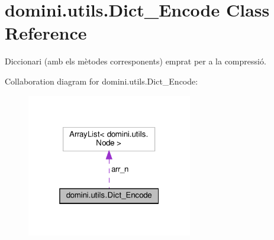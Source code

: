 \hypertarget{classdomini_1_1utils_1_1Dict__Encode}{}\section{domini.\+utils.\+Dict\+\_\+\+Encode Class Reference}
\label{classdomini_1_1utils_1_1Dict__Encode}


Diccionari (amb els mètodes corresponents) emprat per a la compressió.  




Collaboration diagram for domini.\+utils.\+Dict\+\_\+\+Encode\+:\nopagebreak
\begin{figure}[H]
\begin{center}
\leavevmode
\includegraphics[width=205pt]{classdomini_1_1utils_1_1Dict__Encode__coll__graph}
\end{center}
\end{figure}
